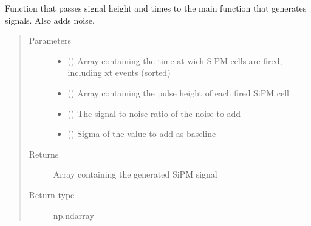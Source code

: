 \documentclass[letterpaper,10pt,english]{sphinxmanual}
\begin{document}
\begin{fulllineitems}
\label{\detokenize{structure:libs.libGPU.signalGen}}
Function that passes signal height and times to the main function that generates signals. Also adds noise.
\begin{quote}\begin{description}
\item[{Parameters}] \leavevmode\begin{itemize}
\item {} 
 (\sphinxstyleliteralemphasis{\sphinxupquote{(}}\sphinxstyleliteralemphasis{\sphinxupquote{)}}) \textendash{} Array containing the time at wich SiPM cells are fired, including xt events (sorted)

\item {} 
 (\sphinxstyleliteralemphasis{\sphinxupquote{(}}\sphinxstyleliteralemphasis{\sphinxupquote{)}}) \textendash{} Array containing the pulse height of each fired SiPM cell

\item {} 
 () \textendash{} The signal to noise ratio of the noise to add

\item {} 
 () \textendash{} Sigma of the value to add as baseline

\end{itemize}

\item[{Returns}] \leavevmode
{} \textendash{} Array containing the generated SiPM signal

\item[{Return type}] \leavevmode
np.ndarray

\end{description}\end{quote}

\end{fulllineitems}
\end{document}
